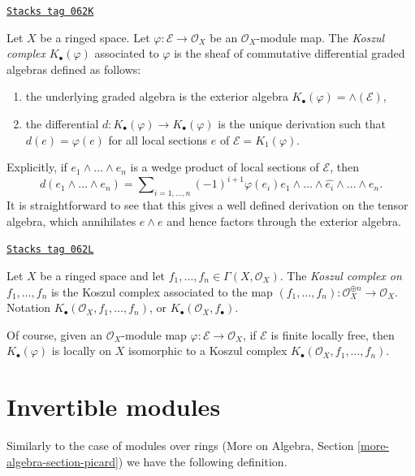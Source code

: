 \begin{definition}[Koszul]
\label{modules-definition-koszul}
\href{https://stacks.math.columbia.edu/tag/062K}{\texttt{Stacks tag 062K}}

Let $X$ be a ringed space. Let $\varphi : \mathcal{E} \to \mathcal{O}_X$
be an $\mathcal{O}_X$-module map. The
{\it Koszul complex} $K_\bullet(\varphi)$ associated to $\varphi$
is the sheaf of commutative differential graded algebras defined as follows:
\begin{enumerate}
\item the underlying graded algebra is the exterior algebra
$K_\bullet(\varphi) = \wedge(\mathcal{E})$,
\item the differential $d : K_\bullet(\varphi) \to K_\bullet(\varphi)$
is the unique derivation such that $d(e) = \varphi(e)$ for all
local sections $e$ of $\mathcal{E} = K_1(\varphi)$.
\end{enumerate}
\end{definition}

Explicitly, if $e_1 \wedge \ldots \wedge e_n$ is a wedge product of local
sections of $\mathcal{E}$, then
$$
d(e_1 \wedge \ldots \wedge e_n) =
\sum\nolimits_{i = 1, \ldots, n} (-1)^{i + 1}
\varphi(e_i)e_1 \wedge \ldots \wedge \widehat{e_i} \wedge \ldots \wedge e_n.
$$
It is straightforward to see that this gives a well defined derivation
on the tensor algebra, which annihilates $e \wedge e$ and hence factors
through the exterior algebra.

\begin{definition}
\label{modules-definition-koszul-complex}
\href{https://stacks.math.columbia.edu/tag/062L}{\texttt{Stacks tag 062L}}

Let $X$ be a ringed space and let
$f_1, \ldots, f_n \in \Gamma(X, \mathcal{O}_X)$. The
{\it Koszul complex on $f_1, \ldots, f_n$} is the Koszul complex
associated to the map
$(f_1, \ldots, f_n) : \mathcal{O}_X^{\oplus n} \to \mathcal{O}_X$.
Notation $K_\bullet(\mathcal{O}_X, f_1, \ldots, f_n)$,
or $K_\bullet(\mathcal{O}_X, f_\bullet)$.
\end{definition}

Of course, given an $\mathcal{O}_X$-module map
$\varphi : \mathcal{E} \to \mathcal{O}_X$,
if $\mathcal{E}$ is finite locally free, then
$K_\bullet(\varphi)$ is locally on $X$ isomorphic to a Koszul complex
$K_\bullet(\mathcal{O}_X, f_1, \ldots, f_n)$.

\section{Invertible modules}
\label{modules-section-invertible}
Similarly to the case of modules over rings
(More on Algebra, Section \ref{more-algebra-section-picard})
we have the following definition.

